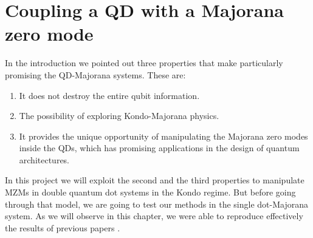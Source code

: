 \chapter{Coupling a QD with a Majorana zero mode \label{chap:Majorana} \label{sec:QD-Majorana}}

In the introduction we pointed out three properties that make particularly promising the QD-Majorana systems. These are:
\begin{enumerate}
\item It does not destroy the entire qubit information.
\item The possibility of exploring Kondo-Majorana physics.
\item It provides the unique opportunity of manipulating the Majorana zero modes inside the QDs, which has promising applications in the design of quantum architectures. 
\end{enumerate}




In this project we will exploit the second and the third properties to manipulate MZMs in double quantum dot systems in the Kondo regime. But before going through that model, we are going to test our methods in the single dot-Majorana system. As we will observe in this chapter, we were able to reproduce effectively the results of previous papers \cite{liu_detecting_2011,ruiz-tijerina_interaction_2015} .



